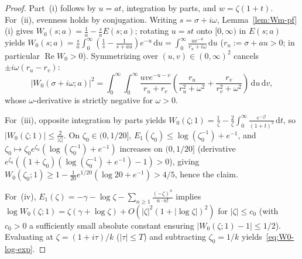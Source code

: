 \documentclass[11pt, reqno]{amsart}
\theoremstyle{remark}
\numberwithin{equation}{section}
\DeclareMathOperator{\re}{Re}
\newcommand{\dd}{\,\mathrm{d}}
\begin{document}
\begin{proof}
Part~(i) follows by $u = a t$, integration by parts, and $w = \zeta(1+t)$.
For~(ii), evenness holds by conjugation. Writing $s = \sigma + i\omega$, Lemma~\ref{lem:Wm-pf}(i) gives
$W_0(s;a) = \frac{1}{a} - \frac{s}{a}E(s;a)$; rotating $u = st$ onto $[0,\infty)$ in $E(s;a)$ yields
$W_0(s;a) = \frac{s}{a}\int_0^\infty (\frac{1}{s} - \frac{1}{s+au})e^{-u}\dd u = \int_0^\infty \frac{u e^{-u}}{r_u + i\omega}\dd u$
($r_u := \sigma + a u > 0$; in particular $\re W_0 > 0$).
Symmetrizing over $(u,v) \in (0,\infty)^2$ cancels $\pm i\omega(r_u - r_v)$:
\[
|W_0(\sigma+i\omega; a)|^2
= \int_0^\infty\!\!\int_0^\infty \frac{u v e^{-u-v}}{r_u + r_v}
\left(\frac{r_u}{r_u^2+\omega^2} + \frac{r_v}{r_v^2+\omega^2}\right)\dd u\dd v,
\]
whose $\omega$-derivative is strictly negative for $\omega > 0$.

For~(iii), opposite integration by parts yields $W_0(\zeta;1) = \frac{1}{\zeta} - \frac{2}{\zeta}\int_0^\infty \frac{e^{-\zeta t}}{(1+t)^3}\dd t$,
so $|W_0(\zeta;1)| \le \frac{2}{|\zeta|}$. On $\zeta_0 \in (0, 1/20]$,
$E_1(\zeta_0) \le \log(\zeta_0^{-1}) + e^{-1}$, and $\zeta_0 \mapsto \zeta_0 e^{\zeta_0}(\log(\zeta_0^{-1})+e^{-1})$
increases on $(0, 1/20]$ (derivative $e^{\zeta_0}((1+\zeta_0)(\log(\zeta_0^{-1})+e^{-1}) - 1) > 0$), giving
$W_0(\zeta_0;1) \ge 1 - \frac{1}{20}e^{1/20}(\log 20 + e^{-1}) > 4/5$, hence the claim.

For~(iv), $E_1(\zeta) = -\gamma - \log\zeta - \sum_{n\ge 1} \frac{(-\zeta)^n}{n\cdot n!}$ implies
$\log W_0(\zeta;1) = \zeta(\gamma + \log\zeta) + O(|\zeta|^2(1+|\log\zeta|)^2)$ for $|\zeta| \le c_0$
(with $c_0 > 0$ a sufficiently small absolute constant ensuring $|W_0(\zeta;1) - 1| \le 1/2$).
Evaluating at $\zeta = (1+i\tau)/k$ ($|\tau| \le T$) and subtracting $\zeta_0 = 1/k$ yields~\eqref{eq:W0-log-exp}.
\end{proof}
\end{document}
